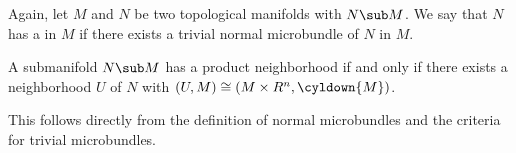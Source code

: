 \begin{mydefinition}
    Again, let $M$ and $N$ be two topological manifolds with $N \sub M$.
    We say that $N$ has a  in $M$ if
    there exists a trivial normal microbundle of $N$ in $M$.
\end{mydefinition}

\begin{mylemma}
    A submanifold $N \sub M$ has a product neighborhood if and only if
    there exists a neighborhood $U$ of $N$ with $(U, M) \cong (M \times R^n, \cyldown{M})$.
\end{mylemma}

\begin{myproof}
    This follows directly from the definition of normal microbundles and the criteria for trivial microbundles.
\end{myproof}